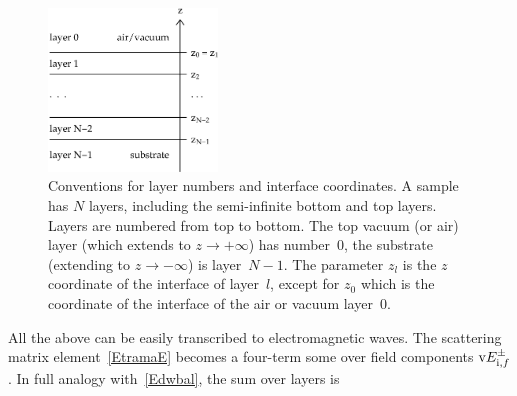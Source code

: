 \begin{figure}[tb]
\begin{center}
\includegraphics[width=0.4\textwidth]{fig/drawing/multilayer_z_conventions.ps}
\end{center}
\caption{Conventions for layer numbers and interface coordinates.
%
%
%
%
%
%
%
%
A sample has $N$ layers,
including the semi-infinite bottom and top layers.
Layers are numbered from top to bottom.
The top vacuum (or air) layer (which extends to $z\to+\infty$) has number~0,
the substrate (extending to $z\to-\infty$) is layer~$N-1$.
The parameter $z_l$
%
is the $z$ coordinate of the  interface of layer~$l$,
except for $z_0$ which is the coordinate of the  interface
of the air or vacuum layer~0.}
\label{Fdefz}
\end{figure}

All the above can be easily transcribed to electromagnetic waves.
The scattering matrix element~\cref{EtramaE}
becomes a four-term some over field components $\text{v}{E}^{\pm}_{\text i,f}$.
In full analogy with~\cref{Edwbal},
the sum over layers is

